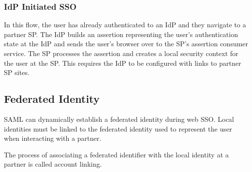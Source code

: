 \subsubsection{IdP Initiated SSO}
In this flow, the user has already authenticated to an IdP and they navigate to a partner SP. The IdP builds an assertion representing the user's authentication state at the IdP and sends the user's browser over to the SP's assertion consumer service. The SP processes the assertion and creates a local security context for the user at the SP. This requires the IdP to be configured with links to partner SP sites.

\subsection{Federated Identity}
SAML can dynamically establish a federated identity during web SSO. Local identities must be linked to the federated identity used to represent the user when interacting with a partner.

The process of associating a federated identifier with the local identity at a partner is called account linking.

